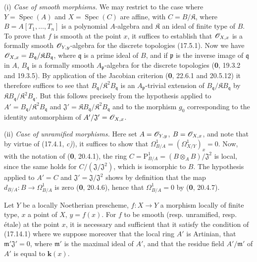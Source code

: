 (i) \emph{Case of smooth morphisms.} We may restrict to the case where $Y=\operatorname{Spec}(A)$ and $X=\operatorname{Spec}(C)$ are affine, with $C=B/\mathfrak{K}$, where $B=A[T_1,\ldots,T_n]$ is a polynomial $A$-algebra and $\mathfrak{K}$ an ideal of finite type of $B$. To prove that $f$ is smooth at the point $x$, it suffices to establish that $\mathscr{O}_{X,x}$ is a formally smooth $\mathscr{O}_{Y,y}$-algebra for the discrete topologies (17.5.1). Now we have $\mathscr{O}_{X,x}=B_{\mathfrak q}/\mathfrak{K}B_{\mathfrak q}$, where $\mathfrak q$ is a prime ideal of $B$, and if $\mathfrak p$ is the inverse image of $\mathfrak q$ in $A$, $B_{\mathfrak q}$ is a formally smooth $A_{\mathfrak p}$-algebra for the discrete topologies (\textbf{0}, 19.3.2 and 19.3.5). By application of the Jacobian criterion (\textbf{0}, 22.6.1 and 20.5.12) it therefore suffices to see that $B_{\mathfrak q}/\mathfrak{K}^2B_{\mathfrak q}$ is an $A_{\mathfrak p}$-trivial extension of $B_{\mathfrak q}/\mathfrak{K}B_{\mathfrak q}$ by $\mathfrak{K}B_{\mathfrak q}/\mathfrak{K}^2B_{\mathfrak q}$. But this follows precisely from the hypothesis applied to $A'=B_{\mathfrak q}/\mathfrak{K}^2B_{\mathfrak q}$ and $\mathfrak{J}'=\mathfrak{K}B_{\mathfrak q}/\mathfrak{K}^2B_{\mathfrak q}$ and to the morphism $g_0$ corresponding to the identity automorphism of $A'/\mathfrak{J}'=\mathscr{O}_{X,x}$.

(ii) \emph{Case of unramified morphisms.} Here set $A=\mathscr{O}_{Y,y}$, $B=\mathscr{O}_{X,x}$, and note that by virtue of (17.4.1, \emph{c)}), it suffices to show that $\Omega^1_{B/A}=(\varOmega^1_{X/Y})_x=0$. Now, with the notation of (\textbf{0}, 20.4.1), the ring $C=\mathrm{P}^1_{B/A}=(B\otimes_A B)/\mathfrak{J}^2$ is local, since the same holds for $C/(\mathfrak{J}/\mathfrak{J}^2)$, which is isomorphic to $B$. The hypothesis applied to $A'=C$ and $\mathfrak{J}'=\mathfrak{J}/\mathfrak{J}^2$ shows by definition that the map $d_{B/A}:B\to\Omega^1_{B/A}$ is zero (\textbf{0}, 20.4.6), hence that $\Omega^1_{B/A}=0$ by (\textbf{0}, 20.4.7).

\begin{proposition}[17.14.2]
\label{IV.17.14.2}
Let $Y$ be a \textup{locally Noetherian} prescheme, $f:X\to Y$ a morphism locally of finite type, $x$ a point of $X$, $y=f(x)$. For $f$ to be smooth \textup{(resp.} unramified, \textup{resp.} étale\textup{)} at the point $x$, it is necessary and sufficient that it satisfy the condition of \textup{(17.14.1)} where we suppose moreover that the local ring $A'$ is \textup{Artinian}, that $\mathfrak m'\mathfrak{J}'=0$, where $\mathfrak m'$ is the maximal ideal of $A'$, and that the residue field $A'/\mathfrak m'$ of $A'$ is \textup{equal to} $\boldsymbol{k}(x)$.
\end{proposition}

